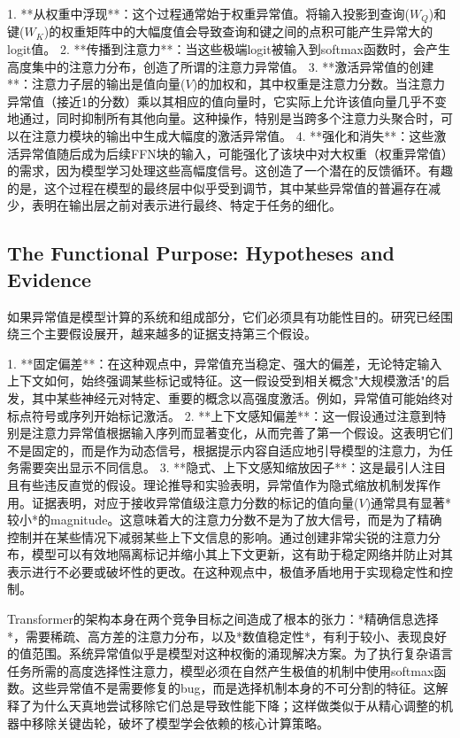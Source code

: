 \documentclass{article}
\begin{document}
1. **从权重中浮现**：这个过程通常始于权重异常值。将输入投影到查询($W_Q$)和键($W_K$)的权重矩阵中的大幅度值会导致查询和键之间的点积可能产生异常大的logit值。
2. **传播到注意力**：当这些极端logit被输入到softmax函数时，会产生高度集中的注意力分布，创造了所谓的注意力异常值。
3. **激活异常值的创建**：注意力子层的输出是值向量($V$)的加权和，其中权重是注意力分数。当注意力异常值（接近1的分数）乘以其相应的值向量时，它实际上允许该值向量几乎不变地通过，同时抑制所有其他向量。这种操作，特别是当跨多个注意力头聚合时，可以在注意力模块的输出中生成大幅度的激活异常值。
4. **强化和消失**：这些激活异常值随后成为后续FFN块的输入，可能强化了该块中对大权重（权重异常值）的需求，因为模型学习处理这些高幅度信号。这创造了一个潜在的反馈循环。有趣的是，这个过程在模型的最终层中似乎受到调节，其中某些异常值的普遍存在减少，表明在输出层之前对表示进行最终、特定于任务的细化。

\subsection{The Functional Purpose: Hypotheses and Evidence}

如果异常值是模型计算的系统和组成部分，它们必须具有功能性目的。研究已经围绕三个主要假设展开，越来越多的证据支持第三个假设。

1. **固定偏差**：在这种观点中，异常值充当稳定、强大的偏差，无论特定输入上下文如何，始终强调某些标记或特征。这一假设受到相关概念"大规模激活"的启发，其中某些神经元对特定、重要的概念以高强度激活。例如，异常值可能始终对标点符号或序列开始标记激活。
2. **上下文感知偏差**：这一假设通过注意到特别是注意力异常值根据输入序列而显著变化，从而完善了第一个假设。这表明它们不是固定的，而是作为动态信号，根据提示内容自适应地引导模型的注意力，为任务需要突出显示不同信息。
3. **隐式、上下文感知缩放因子**：这是最引人注目且有些违反直觉的假设。理论推导和实验表明，异常值作为隐式缩放机制发挥作用。证据表明，对应于接收异常值级注意力分数的标记的值向量($V$)通常具有显著*较小*的magnitude。这意味着大的注意力分数不是为了放大信号，而是为了精确控制并在某些情况下减弱某些上下文信息的影响。通过创建非常尖锐的注意力分布，模型可以有效地隔离标记并缩小其上下文更新，这有助于稳定网络并防止对其表示进行不必要或破坏性的更改。在这种观点中，极值矛盾地用于实现稳定性和控制。

Transformer的架构本身在两个竞争目标之间造成了根本的张力：*精确信息选择*，需要稀疏、高方差的注意力分布，以及*数值稳定性*，有利于较小、表现良好的值范围。系统异常值似乎是模型对这种权衡的涌现解决方案。为了执行复杂语言任务所需的高度选择性注意力，模型必须在自然产生极值的机制中使用softmax函数。这些异常值不是需要修复的bug，而是选择机制本身的不可分割的特征。这解释了为什么天真地尝试移除它们总是导致性能下降；这样做类似于从精心调整的机器中移除关键齿轮，破坏了模型学会依赖的核心计算策略。
\end{document}
